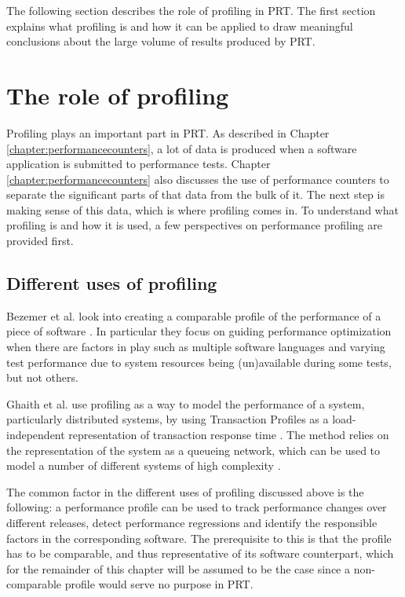The following section describes the role of profiling in PRT. The first section explains what profiling is and how it can be applied to draw meaningful conclusions about the large volume of results produced by PRT.

\section{The role of profiling}
Profiling plays an important part in PRT. As described in Chapter \ref{chapter:performancecounters}, a lot of data is produced when a software application is submitted to performance tests. Chapter \ref{chapter:performancecounters} also discusses the use of performance counters to separate the significant parts of that data from the bulk of it. The next step is making sense of this data, which is where profiling comes in. To understand what profiling is and how it is used, a few perspectives on performance profiling are provided first.

\subsection{Different uses of profiling}
Bezemer et al. look into creating a comparable profile of the performance of a piece of software \cite{io_regressions}. In particular they focus on guiding performance optimization when there are factors in play such as multiple software languages and varying test performance due to system resources being (un)available during some tests, but not others.

Ghaith et al. use profiling as a way to model the performance of a system, particularly distributed systems, by using Transaction Profiles as a load-independent representation of transaction response time \cite{profile_based_detection}. The method relies on the representation of the system as a queueing network, which can be used to model a number of different systems of high complexity \cite{performance_puzzles}.

The common factor in the different uses of profiling discussed above is the following: a performance profile can be used to track performance changes over different releases, detect performance regressions and identify the responsible factors in the corresponding software. The prerequisite to this is that the profile has to be comparable, and thus representative of its software counterpart, which for the remainder of this chapter will be assumed to be the case since a non-comparable profile would serve no purpose in PRT.

